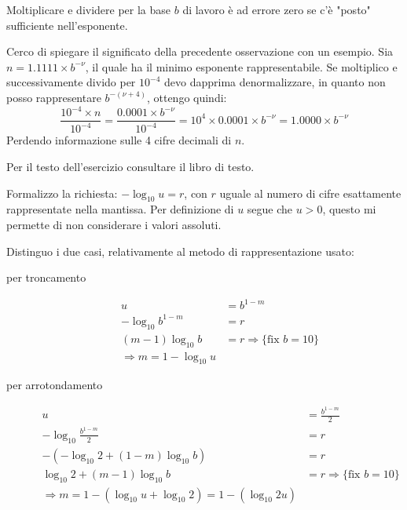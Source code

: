 \begin{oss}
Moltiplicare e dividere per la base $b$ di lavoro \`e ad errore zero se c'\`e 
"posto" sufficiente nell'esponente.
\end{oss}
Cerco di spiegare il significato della precedente osservazione con un esempio.
Sia $n = 1.1111 \times b^{-\nu}$, il quale ha il minimo esponente rappresentabile. Se 
moltiplico e successivamente divido per $10^{-4}$ devo dapprima denormalizzare, 
in quanto non posso rappresentare $b^{-(\nu + 4)}$, ottengo quindi:
\begin{displaymath}
	\frac{10^{-4} \times n}{10^{-4}} = \frac{0.0001 \times b^{-\nu}}{10^{-4}} = 
		10^{4} \times 0.0001 \times b^{-\nu} = 1.0000 \times b^{-\nu}
\end{displaymath}
Perdendo informazione sulle 4 cifre decimali di $n$.

\begin{exercise}[1.9]
Per il testo dell'esercizio consultare il libro di testo.
\end{exercise}
Formalizzo la richiesta: $-\log_{10}{u} = r$, con $r$ uguale al numero di cifre
esattamente rappresentate nella mantissa. Per definizione di $u$ segue che $u > 0$,
questo mi permette di non considerare i valori assoluti.

Distinguo i due casi, relativamente al metodo di rappresentazione usato:
\begin{description}
	\item[per troncamento] 
		\begin{displaymath}
		\begin{split}
			u &= b^{1-m} \\
			-\log_{10}{b^{1-m}} &= r \\
			(m-1)\log_{10}{b} &= r \Rightarrow \lbrace \text{fix } b = 10 \rbrace \\
			\Rightarrow m = 1 - \log_{10}{u}			
		\end{split}
		\end{displaymath}

	\item[per arrotondamento] 
		\begin{displaymath}
		\begin{split}
			u &= \frac{b^{1-m}}{2} \\
			-\log_{10}{\frac{b^{1-m}}{2}} &= r \\
			-\left( -\log_{10}{2} + (1-m)\log_{10}{b} \right) &= r \\
			\log_{10}{2} + (m-1)\log_{10}{b} &= r \Rightarrow 
				\lbrace \text{fix } b = 10 \rbrace \\
			\Rightarrow m = 1 - (\log_{10}{u} + \log_{10}{2}) = 1 - (\log_{10}{2u})
		\end{split}
		\end{displaymath}
\end{description}

